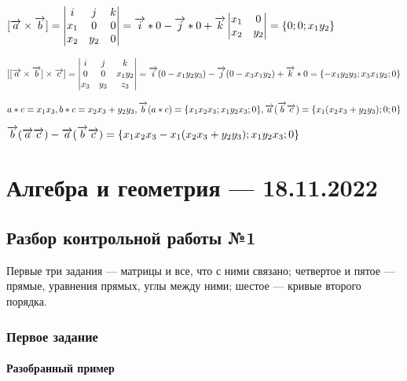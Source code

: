 \documentclass{article}
\def\vec{\ensuremath\overrightarrow}
\begin{document}
\begin{flushleft}
$[ \vec{a} \times \vec{b} ] = \begin{vmatrix}
    i & j & k \\
    x_1 & 0 & 0 \\
    x_2 & y_2 & 0
\end{vmatrix} = \vec{i} * 0 - \vec{j} * 0 + \vec{k} \begin{vmatrix}
    x_1 & 0 \\
    x_2 & y_2
\end{vmatrix} = \{ 0; 0; x_1 y_2 \}$

$[ [ \vec{a} \times \vec{b} ] \times \vec{c} ] = \begin{vmatrix}
    i & j & k \\
    0 & 0 & x_1 y_2 \\
    x_3 & y_3 & z_3
\end{vmatrix} = \vec{i} (0 - x_1 y_2 y_3) - \vec{j} (0 - x_3 x_1 y_2 ) + \vec{k} * 0 = \{ -x_1 y_2 y_3; x_3 x_1 y_2; 0 \}$

$a * c = x_1 x_3, b * c = x_2 x_3 + y_2 y_3, \vec{b} (a * c) = \{x_1 x_2 x_3; x_1 y_2 x_3; 0 \}, \vec{a} (\vec{b} \vec{c}) = \{ x_1 (x_2 x_3 + y_2 y_3); 0; 0 \}$

$\vec{b} (\vec{a} \vec{c}) - \vec{a} (\vec{b} \vec{c}) = \{ x_1 x_2 x_3 - x_1 (x_2 x_3 + y_2 y_3); x_1 y_2 x_3; 0 \}$

\end{flushleft}

\pagebreak
\section{Алгебра и геометрия — 18.11.2022}

\subsection{Разбор контрольной работы №1}

Первые три задания — матрицы и все, что с ними связано; четвертое и пятое — прямые, уравнения прямых, углы между ними; шестое — кривые второго порядка.

\subsubsection{Первое задание}

\paragraph{Разобранный пример}
\end{document}
